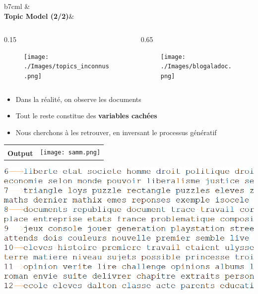 \documentclass[12pt]{beamer}
\begin{document}
\begin{frame}
\begin{tabular}{b{7cm}l}
& \\ {\large \textbf{Topic Model (2/2)}}& 
\end{tabular}
\begin{columns}

\begin{column}{0.15\linewidth}
\centering
\begin{figure}
\texttt{[image: ./Images/topics\_inconnus.png]}
\end{figure}
\end{column}

\begin{column}{0.65\linewidth}
\centering
\begin{figure}
\texttt{[image: ./Images/blogaladoc.png]}
\end{figure}
\end{column}

\end{columns}

\begin{itemize}
\item Dans la réalité, on observe les documents
\pause
\item Tout le reste constitue des \textbf{variables cachées}
\item Nous cherchons à les retrouver, en inversant le processus génératif
\end{itemize}
\end{frame}

\begin{frame}
\begin{tabular}{b{7cm}l}
& \multirow{2}{*}{\texttt{[image: samm.png]}}\\ {\large \textbf{Output}}& 
\end{tabular}

\vspace{1.5cm}

\includegraphics[scale=0.25]{code4-clefs.png}

\end{frame}
\end{document}

